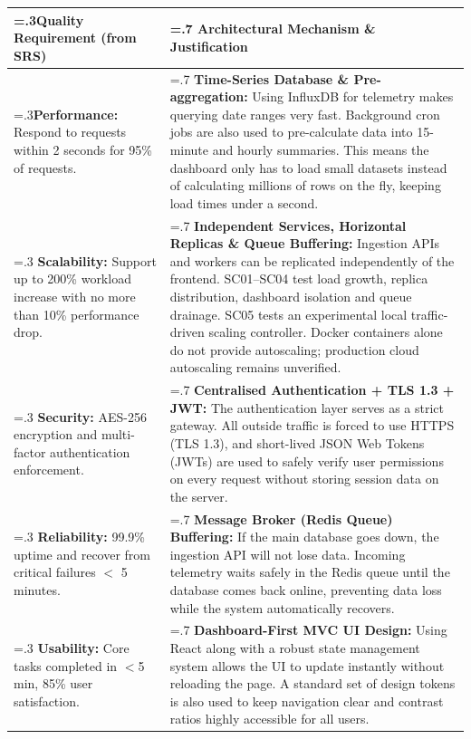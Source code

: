 \documentclass[12pt, a4paper]{article}
\begin{document}
\begin{table}[h!]
\centering
\sloppy
\renewcommand{\arraystretch}{1.5}
\begin{tabularx}{\textwidth}{|>{\hsize=.3\hsize}X|>{\hsize=.7\hsize}X|}
\hline
\textbf{Quality Requirement (from SRS)} & \textbf{Architectural Mechanism \& Justification} \\ \hline
\textbf{Performance:} Respond to requests within 2 seconds for 95\% of requests. & \textbf{Time-Series Database \& Pre-aggregation:} Using InfluxDB for telemetry makes querying date ranges very fast. Background cron jobs are also used to pre-calculate data into 15-minute and hourly summaries. This means the dashboard only has to load small datasets instead of calculating millions of rows on the fly, keeping load times under a second. \\ \hline
\textbf{Scalability:} Support up to 200\% workload increase with no more than 10\% performance drop. & \textbf{Independent Services, Horizontal Replicas \& Queue Buffering:} Ingestion APIs and workers can be replicated independently of the frontend. SC01--SC04 test load growth, replica distribution, dashboard isolation and queue drainage. SC05 tests an experimental local traffic-driven scaling controller. Docker containers alone do not provide autoscaling; production cloud autoscaling remains unverified. \\ \hline
\textbf{Security:} AES-256 encryption and multi-factor authentication enforcement. & \textbf{Centralised Authentication + TLS 1.3 + JWT:} The authentication layer serves as a strict gateway. All outside traffic is forced to use HTTPS (TLS 1.3), and short-lived JSON Web Tokens (JWTs) are used to safely verify user permissions on every request without storing session data on the server. \\ \hline
\textbf{Reliability:} 99.9\% uptime and recover from critical failures $<$ 5 minutes. & \textbf{Message Broker (Redis Queue) Buffering:} If the main database goes down, the ingestion API will not lose data. Incoming telemetry waits safely in the Redis queue until the database comes back online, preventing data loss while the system automatically recovers. \\ \hline
\textbf{Usability:} Core tasks completed in $<$5 min, 85\% user satisfaction. & \textbf{Dashboard-First MVC UI Design:} Using React along with a robust state management system allows the UI to update instantly without reloading the page. A standard set of design tokens is also used to keep navigation clear and contrast ratios highly accessible for all users. \\ \hline

\end{tabularx}
\end{table}
\end{document}
